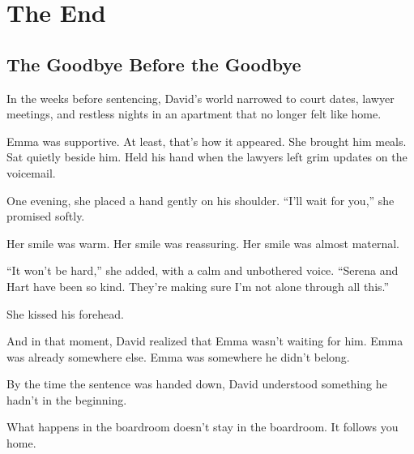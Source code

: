 \section{The End}

\subsection{The Goodbye Before the Goodbye}

In the weeks before sentencing, David’s world narrowed to court dates, lawyer meetings, and restless 
nights in an apartment that no longer felt like home.

Emma was supportive. At least, that’s how it appeared.  
She brought him meals. Sat quietly beside him. Held his hand when the lawyers left grim updates on the voicemail.

One evening, she placed a hand gently on his shoulder.  
``I’ll wait for you,'' she promised softly.  

Her smile was warm. Her smile was reassuring. Her smile was almost maternal.  

``It won’t be hard,'' she added, with a calm and unbothered voice.
``Serena and Hart have been so kind. They’re making sure I’m not alone through all this.''

She kissed his forehead.

And in that moment, David realized that 
Emma wasn’t waiting for him.  
Emma was already somewhere else.  
Emma was somewhere he didn't belong.

By the time the sentence was handed down,  
David understood something he hadn’t in the beginning. 

What happens in the boardroom doesn't stay in the boardroom.  It follows you home.

\medskip

